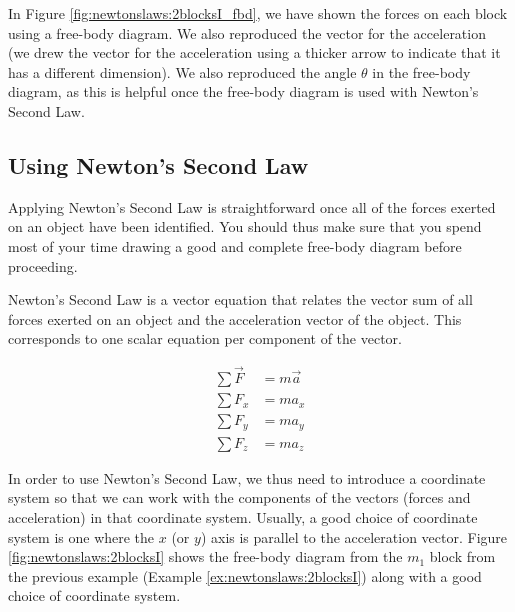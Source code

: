 \begin{example}
In Figure \ref{fig:newtonslaws:2blocksI_fbd}, we have shown the forces on each block using a free-body diagram. We also reproduced the vector for the acceleration (we drew the vector for the acceleration using a thicker arrow to indicate that it has a different dimension). We also reproduced the angle $\theta$ in the free-body diagram, as this is helpful once the free-body diagram is used with Newton's Second Law.

\end{example}

\subsection{Using Newton's Second Law}
Applying Newton's Second Law is straightforward once all of the forces exerted on an object have been identified. You should thus make sure that you spend most of your time drawing a good and complete free-body diagram before proceeding.

Newton's Second Law is a vector equation that relates the vector sum of all forces exerted on an object and the acceleration vector of the object. This corresponds to one scalar equation per component of the vector.

\begin{align*}
\sum \vec F &=m\vec a\\
\sum F_x &= ma_x \\
\sum F_y &= ma_y \\
\sum F_z &= ma_z
\end{align*}

In order to use Newton's Second Law, we thus need to introduce a coordinate system so that we can work with the components of the vectors (forces and acceleration) in that coordinate system. Usually, a good choice of coordinate system is one where the $x$ (or $y$) axis is parallel to the acceleration vector. Figure \ref{fig:newtonslaws:2blocksI} shows the free-body diagram from the $m_1$ block from the previous example (Example \ref{ex:newtonslaws:2blocksI}) along with a good choice of coordinate system. 



